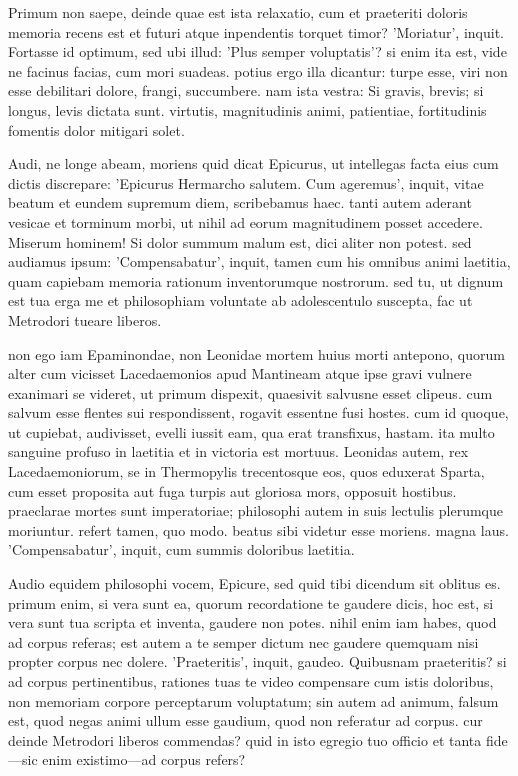  Primum non saepe, deinde quae est ista relaxatio, cum et praeteriti doloris memoria recens est et futuri atque inpendentis torquet timor? 'Moriatur', inquit. Fortasse id optimum, sed ubi illud: 'Plus semper voluptatis'? si enim ita est, vide ne facinus facias, cum mori suadeas. potius ergo illa dicantur: turpe esse, viri non esse debilitari dolore, frangi, succumbere. nam ista vestra: Si gravis, brevis; si longus, levis dictata sunt. virtutis, magnitudinis animi, patientiae, fortitudinis fomentis dolor mitigari solet.

 Audi, ne longe abeam, moriens quid dicat Epicurus, ut intellegas facta eius cum dictis discrepare: 'Epicurus Hermarcho salutem. Cum ageremus', inquit, vitae beatum et eundem supremum diem, scribebamus haec. tanti autem aderant vesicae et torminum morbi, ut nihil ad eorum magnitudinem posset accedere. Miserum hominem! Si dolor summum malum est, dici aliter non potest. sed audiamus ipsum: 'Compensabatur', inquit, tamen cum his omnibus animi laetitia, quam capiebam memoria rationum inventorumque nostrorum. sed tu, ut dignum est tua erga me et philosophiam voluntate ab adolescentulo suscepta, fac ut Metrodori tueare liberos.

 non ego iam Epaminondae, non Leonidae mortem huius morti antepono, quorum alter cum vicisset Lacedaemonios apud Mantineam atque ipse gravi vulnere exanimari se videret, ut primum dispexit, quaesivit salvusne esset clipeus. cum salvum esse flentes sui respondissent, rogavit essentne fusi hostes. cum id quoque, ut cupiebat, audivisset, evelli iussit eam, qua erat transfixus, hastam. ita multo sanguine profuso in laetitia et in victoria est mortuus. Leonidas autem, rex Lacedaemoniorum, se in Thermopylis trecentosque eos, quos eduxerat Sparta, cum esset proposita aut fuga turpis aut gloriosa mors, opposuit hostibus. praeclarae mortes sunt imperatoriae; philosophi autem in suis lectulis plerumque moriuntur. refert tamen, quo modo. beatus sibi videtur esse moriens. magna laus. 'Compensabatur', inquit, cum summis doloribus laetitia.

 Audio equidem philosophi vocem, Epicure, sed quid tibi dicendum sit oblitus es. primum enim, si vera sunt ea, quorum recordatione te gaudere dicis, hoc est, si vera sunt tua scripta et inventa, gaudere non potes. nihil enim iam habes, quod ad corpus referas; est autem a te semper dictum nec gaudere quemquam nisi propter corpus nec dolere. 'Praeteritis', inquit, gaudeo. Quibusnam praeteritis? si ad corpus pertinentibus, rationes tuas te video compensare cum istis doloribus, non memoriam corpore perceptarum voluptatum; sin autem ad animum, falsum est, quod negas animi ullum esse gaudium, quod non referatur ad corpus. cur deinde Metrodori liberos commendas? quid in isto egregio tuo officio et tanta fide—sic enim existimo—ad corpus refers?

